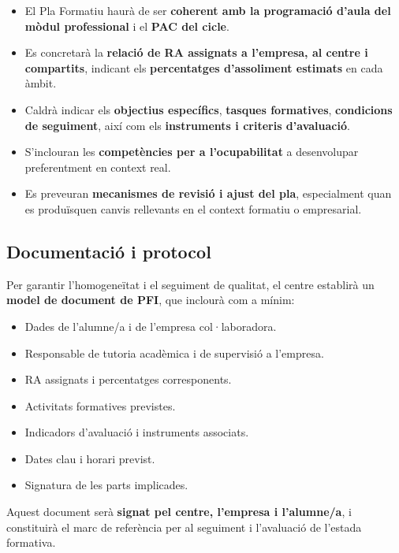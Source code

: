 \documentclass[
  paper=a4,
  ,captions=tableheading
]{scrartcl}
\providecommand{\tightlist}{%
  \setlength{\itemsep}{0pt}\setlength{\parskip}{0pt}}
\begin{document}
\begin{itemize}
\tightlist
\item
  El Pla Formatiu haurà de ser \textbf{coherent amb la programació
  d'aula del mòdul professional} i el \textbf{PAC del cicle}.
\item
  Es concretarà la \textbf{relació de RA assignats a l'empresa, al
  centre i compartits}, indicant els \textbf{percentatges d'assoliment
  estimats} en cada àmbit.
\item
  Caldrà indicar els \textbf{objectius específics}, \textbf{tasques
  formatives}, \textbf{condicions de seguiment}, així com els
  \textbf{instruments i criteris d'avaluació}.
\item
  S'inclouran les \textbf{competències per a l'ocupabilitat} a
  desenvolupar preferentment en context real.
\item
  Es preveuran \textbf{mecanismes de revisió i ajust del pla},
  especialment quan es produïsquen canvis rellevants en el context
  formatiu o empresarial.
\end{itemize}

\hypertarget{documentaciuxf3-i-protocol}{%
\subsection{Documentació i protocol}\label{documentaciuxf3-i-protocol}}

Per garantir l'homogeneïtat i el seguiment de qualitat, el centre
establirà un \textbf{model de document de PFI}, que inclourà com a
mínim:

\begin{itemize}
\tightlist
\item
  Dades de l'alumne/a i de l'empresa col·laboradora.
\item
  Responsable de tutoria acadèmica i de supervisió a l'empresa.
\item
  RA assignats i percentatges corresponents.
\item
  Activitats formatives previstes.
\item
  Indicadors d'avaluació i instruments associats.
\item
  Dates clau i horari previst.
\item
  Signatura de les parts implicades.
\end{itemize}

Aquest document serà \textbf{signat pel centre, l'empresa i l'alumne/a},
i constituirà el marc de referència per al seguiment i l'avaluació de
l'estada formativa.
\end{document}
